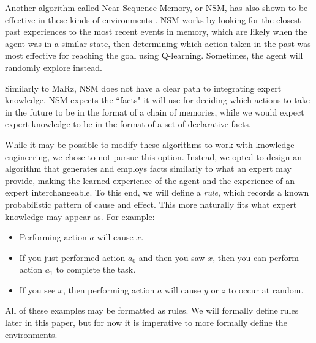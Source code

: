\documentclass[letterpaper]{article} %
\begin{document}
Another algorithm called Near Sequence Memory, or NSM, has also shown to be effective in these kinds of environments \cite{McCallum95}. NSM works by looking for the closest past experiences to the most recent events in memory, which are likely when the agent was in a similar state, then determining which action taken in the past was most effective for reaching the goal using Q-learning. Sometimes, the agent will randomly explore instead.

Similarly to MaRz, NSM does not have a clear path to integrating expert knowledge. NSM expects the ``facts" it will use for deciding which actions to take in the future to be in the format of a chain of memories, while we would expect expert knowledge to be in the format of a set of declarative facts.

While it may be possible to modify these algorithms to work with knowledge engineering, we chose to not pursue this option. Instead, we opted to design an algorithm that generates and employs facts similarly to what an expert may provide, making the learned experience of the agent and the experience of an expert interchangeable. To this end, we will define a \textit{rule}, which records a known probabilistic pattern of cause and effect. This more naturally fits what expert knowledge may appear as. For example:
\begin{itemize}
	\item Performing action $a$ will cause $x$.
	\item If you just performed action $a_0$ and then you saw $x$, then you can perform action $a_1$ to complete the task.
	\item If you see $x$, then performing action $a$ will cause $y$ or $z$ to occur at random.
\end{itemize}
All of these examples may be formatted as rules. We will formally define rules later in this paper, but for now it is imperative to more formally define the environments.
\end{document}
